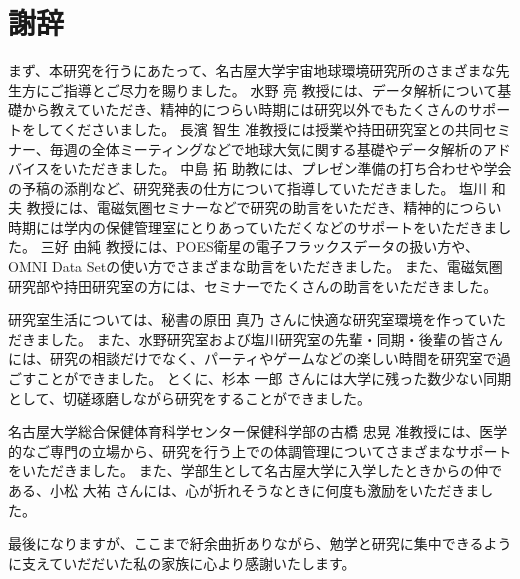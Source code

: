 \chapter*{謝辞}
まず、本研究を行うにあたって、名古屋大学宇宙地球環境研究所のさまざまな先生方にご指導とご尽力を賜りました。
水野 亮 教授には、データ解析について基礎から教えていただき、精神的につらい時期には研究以外でもたくさんのサポートをしてくださいました。
長濱 智生 准教授には授業や持田研究室との共同セミナー、毎週の全体ミーティングなどで地球大気に関する基礎やデータ解析のアドバイスをいただきました。
中島 拓 助教には、プレゼン準備の打ち合わせや学会の予稿の添削など、研究発表の仕方について指導していただきました。
塩川 和夫 教授には、電磁気圏セミナーなどで研究の助言をいただき、精神的につらい時期には学内の保健管理室にとりあっていただくなどのサポートをいただきました。
三好 由純 教授には、POES衛星の電子フラックスデータの扱い方や、OMNI Data Setの使い方でさまざまな助言をいただきました。
また、電磁気圏研究部や持田研究室の方には、セミナーでたくさんの助言をいただきました。
\par

研究室生活については、秘書の原田 真乃 さんに快適な研究室環境を作っていただきました。
また、水野研究室および塩川研究室の先輩・同期・後輩の皆さんには、研究の相談だけでなく、パーティやゲームなどの楽しい時間を研究室で過ごすことができました。
とくに、杉本 一郎 さんには大学に残った数少ない同期として、切磋琢磨しながら研究をすることができました。\par

名古屋大学総合保健体育科学センター保健科学部の古橋 忠晃 准教授には、医学的なご専門の立場から、研究を行う上での体調管理についてさまざまなサポートをいただきました。
また、学部生として名古屋大学に入学したときからの仲である、小松 大祐 さんには、心が折れそうなときに何度も激励をいただきました。\par

最後になりますが、ここまで紆余曲折ありながら、勉学と研究に集中できるように支えていだだいた私の家族に心より感謝いたします。
